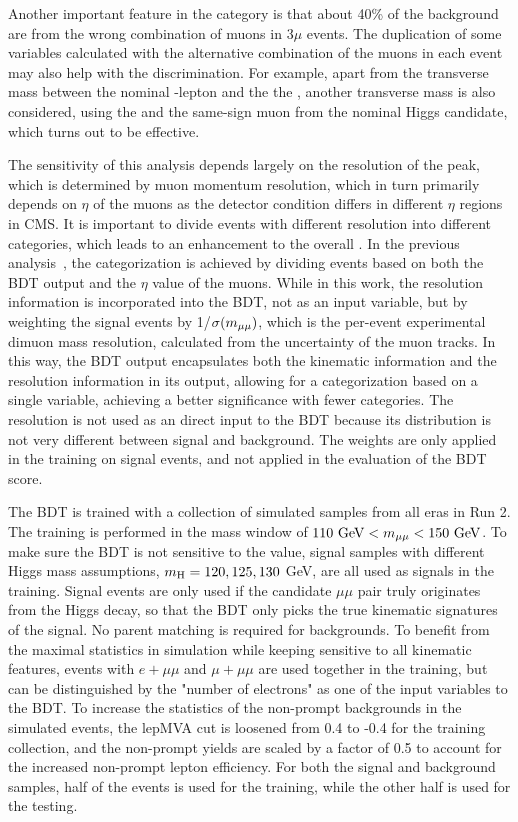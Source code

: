 Another important feature in the \WH category is that about 40\% of the \WZ background are from the wrong combination of muons in 3$\mu$ events.  
The duplication of some variables calculated with the alternative combination of the muons in each event may also help with the discrimination.
For example, apart from the transverse mass between the nominal \PW-lepton and the the \MHT, 
another transverse mass is also considered, using the \MHT and the same-sign muon from the nominal Higgs candidate,
which turns out to be effective.

The sensitivity of this analysis depends largely on the resolution of the \mmm peak, which is determined by muon momentum resolution,
which in turn primarily depends on $\eta$ of the muons as the detector condition differs in different $\eta$ regions in CMS.
It is important to divide events with different resolution into different categories, which leads to an enhancement to the overall \SoB.
In the previous \hmm analysis~\cite{PhysRevLett.122.021801, carnesthesis}, the categorization is achieved by dividing events based on 
both the BDT output and the $\eta$ value of the muons.  
While in this work, the resolution information is incorporated into the BDT, not as an input variable, but by weighting the signal events by 1/$\sigma(m_{\mu\mu})$,
which is the per-event experimental dimuon mass resolution, calculated from the \pt uncertainty of the muon tracks.
In this way, the BDT output encapsulates both the kinematic information and the resolution information in its output, 
allowing for a categorization based on a single variable, achieving a better significance with fewer categories.
The resolution is not used as an direct input to the BDT because its distribution is not very different between signal and background.
The weights are only applied in the training on signal events, and not applied in the evaluation of the BDT score.

The BDT is trained with a collection of simulated samples from all eras in Run 2.  
The training is performed in the mass window of $110 ~\mbox{GeV}{} < m_{\mu\mu} < 150 ~\mbox{GeV}{}$.  
To make sure the BDT is not sensitive to the \mmm value, signal samples with different Higgs mass assumptions, 
$m_{\mathrm{H}} = 120, 125, 130$ GeV, are all used as signals in the training.  
Signal events are only used if the candidate $\mu\mu$ pair truly originates from the Higgs decay, 
so that the BDT only picks the true kinematic signatures of the signal. No parent matching is required for backgrounds.   
To benefit from the maximal statistics in simulation while keeping sensitive to all kinematic features, 
events with $e+\mu\mu$ and $\mu+\mu\mu$ are used together in the training, but can be distinguished 
by the "number of electrons" as one of the input variables to the BDT.  
To increase the statistics of the non-prompt backgrounds in the simulated events, 
the lepMVA cut is loosened from 0.4 to -0.4 for the training collection, 
and the non-prompt yields are scaled by a factor of 0.5 to account for the increased non-prompt lepton efficiency.  
For both the signal and background samples, half of the events is used for the training, 
while the other half is used for the testing.

